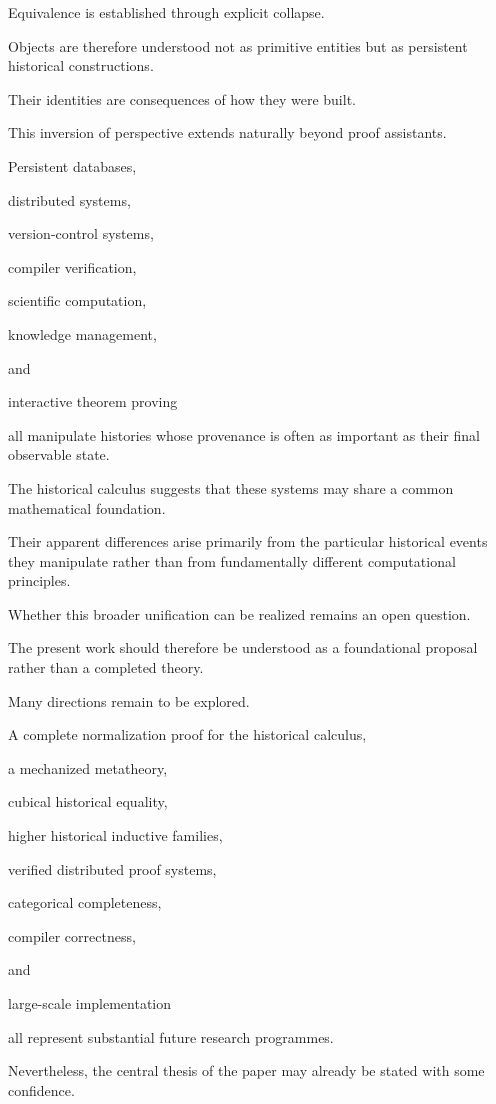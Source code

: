 \documentclass[12pt,oneside]{article}
\theoremstyle{definition}
\theoremstyle{remark}
\begin{document}
Equivalence is established through explicit collapse.

Objects are therefore understood not as primitive entities but as persistent
historical constructions.

Their identities are consequences of how they were built.

This inversion of perspective extends naturally beyond proof assistants.

Persistent databases,

distributed systems,

version-control systems,

compiler verification,

scientific computation,

knowledge management,

and

interactive theorem proving

all manipulate histories whose provenance is often as important as their final
observable state.

The historical calculus suggests that these systems may share a common
mathematical foundation.

Their apparent differences arise primarily from the particular historical events
they manipulate rather than from fundamentally different computational
principles.

Whether this broader unification can be realized remains an open question.

The present work should therefore be understood as a foundational proposal
rather than a completed theory.

Many directions remain to be explored.

A complete normalization proof for the historical calculus,

a mechanized metatheory,

cubical historical equality,

higher historical inductive families,

verified distributed proof systems,

categorical completeness,

compiler correctness,

and

large-scale implementation

all represent substantial future research programmes.

Nevertheless, the central thesis of the paper may already be stated with some
confidence.
\end{document}
